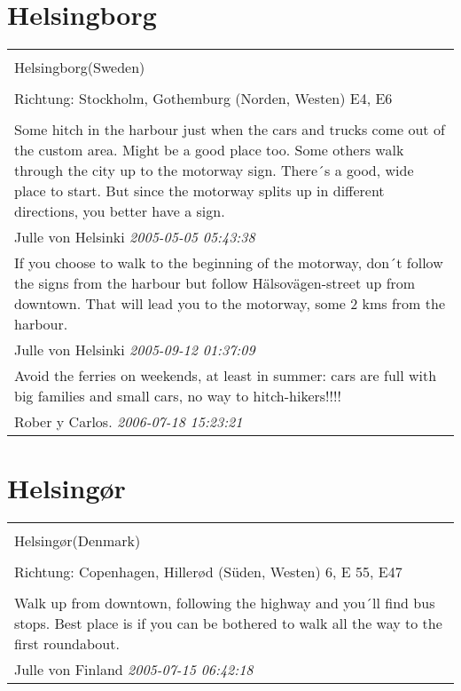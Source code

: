 \documentclass[a4paper,12pt]{article}
\begin{document}
\section{Helsingborg}
\begin{tabular}{|p{13cm}|}
\hline\\
Helsingborg(Sweden)\\
\\
Richtung: Stockholm, Gothemburg (Norden, Westen) E4, E6 \\
\hline\\
Some hitch in the harbour just when the cars and trucks come out of the custom area. Might be a good place too. Some others walk through the city up to the motorway sign. There´s a good, wide place to start. But since the motorway splits up in different directions, you better have a sign. \\
Julle von Helsinki \textit{ 2005-05-05 05:43:38 }\\\hline If you choose to walk to the beginning of the motorway, don´t follow the signs from the harbour but follow Hälsovägen-street up from downtown. That will lead you to the motorway, some 2 kms from the harbour. \\
Julle von Helsinki \textit{ 2005-09-12 01:37:09 }\\\hline Avoid the ferries on weekends, at least in summer: cars are full with big families and small cars, no way to hitch-hikers!!!! \\
Rober y Carlos. \textit{ 2006-07-18 15:23:21 }\\\hline
\end{tabular}


\section{Helsingør}
\begin{tabular}{|p{13cm}|}
\hline\\
Helsingør(Denmark)\\
\\
Richtung: Copenhagen, Hillerød (Süden, Westen) 6, E 55, E47 \\
\hline\\
Walk up from downtown, following the highway and you´ll find bus stops. Best place is if you can be bothered to walk all the way to the first roundabout. \\
Julle von Finland \textit{ 2005-07-15 06:42:18 }\\\hline
\end{tabular}
\end{document}
